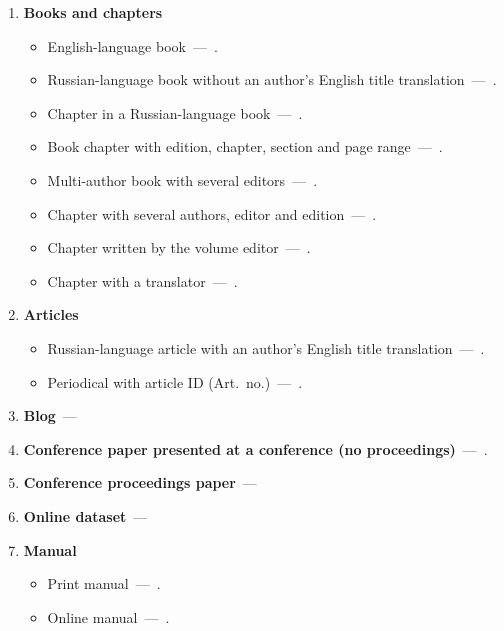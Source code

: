 \documentclass[eqsecnum,authorsinfo]{kioj6}
\begin{document}
    \begin{enumerate}
        \item \textbf{Books and chapters}
        \begin{itemize}[nosep]
            \item English-language book~---~\cite{Hairer}.
            \item Russian-language book without an author's English title translation~---~\cite{Gubanov}.
            \item Chapter in a Russian-language book~---~\cite{layexpl7}.
            \item Book chapter with edition, chapter, section and page range~---~\cite{ogura}.
            \item Multi-author book with several editors~---~\cite{HastieTibshiraniFriedman2009}.
            \item Chapter with several authors, editor and edition~---~\cite{Alberts2014CellCycle}.
            \item Chapter written by the volume editor~---~\cite{Gowers2008LanguageGrammar}.
            \item Chapter with a translator~---~\cite{Aleksandrov1963GeneralView}.
        \end{itemize}

        \item \textbf{Articles}
        \begin{itemize}[nosep]
            \item Russian-language article with an author's English title translation~---~\cite{Matveenko}.
            \item Periodical with article ID (Art.~no.)~---~\cite{Abbott2016GW150914}.
        \end{itemize}

        \item \textbf{Blog}~---~\cite{Dmitry2024Python}

        \item \textbf{Conference paper presented at a conference (no proceedings)}~---~\cite{Caratelli}.

        \item \textbf{Conference proceedings paper}~---~\cite{BYSIS2022}

        \item \textbf{Online dataset}~---~\cite{pavlov_2025_14923680}

        \item \textbf{Manual}
        \begin{itemize}[nosep]
            \item Print manual~---~\cite{TransmissionSystems}.
            \item Online manual~---~\cite{BreimannRF}.
        \end{itemize}


\end{enumerate}
\end{document}
